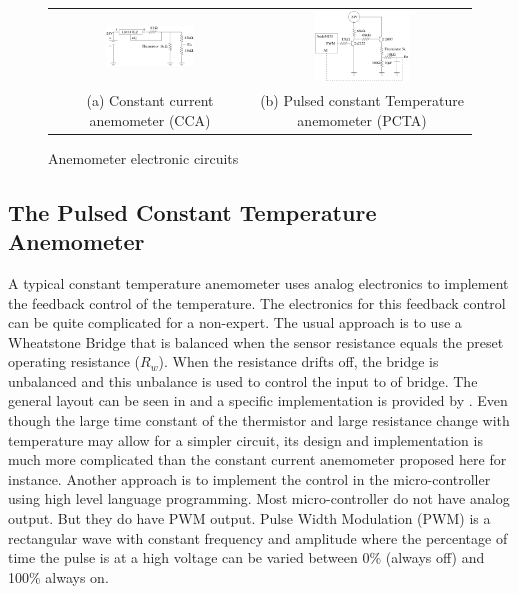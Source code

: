 \documentclass[10pt,fleqn,a4paper,twoside]{article}
\begin{document}
\begin{figure}[h!]
  \centering
  \begin{tabular}{cc}
    \includegraphics[width=0.46\textwidth]{../../figures/cca.pdf} &
    \includegraphics[width=0.46\textwidth]{../../figures/cta.pdf} \\
    (a) Constant current anemometer (CCA) & (b) Pulsed constant Temperature anemometer (PCTA)\\
  \end{tabular}
  \vspace{0.5cm}
  \caption{Anemometer electronic circuits }
\label{fig:electronics}
\end{figure}



\subsection{The Pulsed Constant Temperature Anemometer}

A typical constant temperature anemometer uses analog electronics to implement the feedback control of the temperature. The electronics for this feedback control can be quite complicated for a non-expert. The usual approach is to use a Wheatstone Bridge that is balanced when the sensor resistance equals the preset operating resistance ($R_w$). When the resistance drifts off, the bridge is unbalanced and this unbalance is used to control the input to of bridge. The general layout can be seen in \citet{Lomas86} and a specific implementation is provided by \citet{Palma16}. Even though the large time constant of the thermistor and large resistance change with temperature may allow for a simpler circuit, its design and implementation is much more complicated than the constant current anemometer proposed here for instance. Another approach is to implement the control in the micro-controller using high level language programming. Most micro-controller do not have analog output. But they do have PWM output. Pulse Width Modulation (PWM) is a rectangular wave with constant frequency and amplitude where the percentage of time the pulse is at a high voltage can be varied between 0\% (always off) and 100\% always on.
\end{document}
